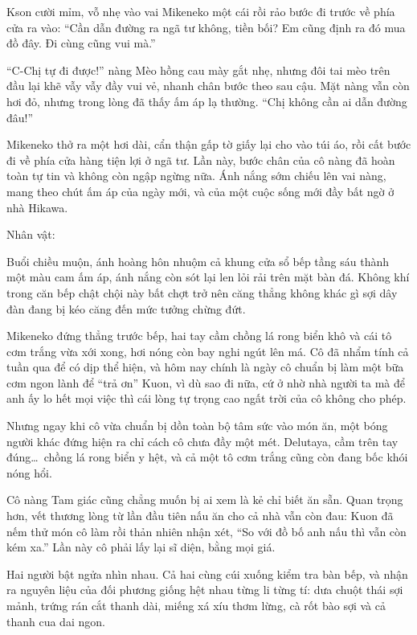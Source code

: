 ﻿\documentclass[../main.tex]{subfiles}
\begin{document}
Kson cười mỉm, vỗ nhẹ vào vai Mikeneko một cái rồi rảo bước đi trước về phía cửa ra vào: ``Cần dẫn đường ra ngã tư không, tiền bối? Em cũng định ra đó mua đồ đây. Đi cùng cũng vui mà.''

``C-Chị tự đi được!'' nàng Mèo hồng cau mày gắt nhẹ, nhưng đôi tai mèo trên đầu lại khẽ vẫy vẫy đầy vui vẻ, nhanh chân bước theo sau cậu. Mặt nàng vẫn còn hơi đỏ, nhưng trong lòng đã thấy ấm áp lạ thường. ``Chị không cần ai dẫn đường đâu!''

Mikeneko thở ra một hơi dài, cẩn thận gấp tờ giấy lại cho vào túi áo, rồi cất bước đi về phía cửa hàng tiện lợi ở ngã tư. Lần này, bước chân của cô nàng đã hoàn toàn tự tin và không còn ngập ngừng nữa. Ánh nắng sớm chiếu lên vai nàng, mang theo chút ấm áp của ngày mới, và của một cuộc sống mới đầy bất ngờ ở nhà Hikawa.

\newpage

\begin{center}
    {\caviar\fontsize{12pt}{12pt}\selectfont Nhân vật:   }
\end{center}

Buổi chiều muộn, ánh hoàng hôn nhuộm cả khung cửa sổ bếp tầng sáu thành một màu cam ấm áp, ánh nắng còn sót lại len lỏi rải trên mặt bàn đá. Không khí trong căn bếp chật chội này bất chợt trở nên căng thẳng không khác gì sợi dây đàn đang bị kéo căng đến mức tưởng chừng đứt.

Mikeneko đứng thẳng trước bếp, hai tay cầm chồng lá rong biển khô và cái tô cơm trắng vừa xới xong, hơi nóng còn bay nghi ngút lên má. Cô đã nhẩm tính cả tuần qua để có dịp thể hiện, và hôm nay chính là ngày cô chuẩn bị làm một bữa cơm ngon lành để ``trả ơn'' Kuon, vì dù sao đi nữa, cứ ở nhờ nhà người ta mà để anh ấy lo hết mọi việc thì cái lòng tự trọng cao ngất trời của cô không cho phép.

Nhưng ngay khi cô vừa chuẩn bị dồn toàn bộ tâm sức vào món ăn, một bóng người khác đứng hiện ra chỉ cách cô chưa đầy một mét. Delutaya, cầm trên tay đúng\dots\ chồng lá rong biển y hệt, và cả một tô cơm trắng cũng còn đang bốc khói nóng hổi.

Cô nàng Tam giác cũng chẳng muốn bị ai xem là kẻ chỉ biết ăn sẵn. Quan trọng hơn, vết thương lòng từ lần đầu tiên nấu ăn cho cả nhà vẫn còn đau: Kuon đã nếm thử món cô làm rồi thản nhiên nhận xét, ``So với đồ bố anh nấu thì vẫn còn kém xa.'' Lần này cô phải lấy lại sĩ diện, bằng mọi giá.

Hai người bật ngửa nhìn nhau. Cả hai cùng cúi xuống kiểm tra bàn bếp, và nhận ra nguyên liệu của đối phương giống hệt nhau từng li từng tí: dưa chuột thái sợi mảnh, trứng rán cắt thanh dài, miếng xá xíu thơm lừng, cà rốt bào sợi và cả thanh cua dai ngon.
\end{document}
